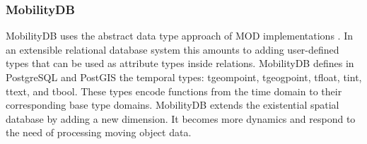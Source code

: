 \documentclass[twoside,12pt, a4paper]{report}
\begin{document}
\subsubsection{MobilityDB}
MobilityDB uses the abstract data type approach of MOD implementations
\cite{guting2000foundation}. In an extensible relational database system this
amounts to adding user-defined types that can be used as attribute
types inside relations. MobilityDB defines in PostgreSQL and PostGIS
the temporal types: tgeompoint, tgeogpoint, tfloat, tint,
ttext, and tbool. These types encode functions from the time
domain to their corresponding base type domains. MobilityDB extends the existential
spatial database by adding a new dimension. It becomes more dynamics and respond to the need 
of processing moving object data. 




\newpage
\printbibliography
%
%
\end{document}
